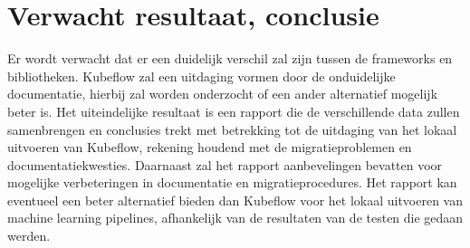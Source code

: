 




\section{Verwacht resultaat, conclusie}%
\label{sec:verwachte_resultaten}
Er wordt verwacht dat er een duidelijk verschil zal zijn tussen de frameworks en bibliotheken. Kubeflow zal een uitdaging vormen door de onduidelijke documentatie, hierbij zal worden onderzocht of een ander alternatief mogelijk beter is.
Het uiteindelijke resultaat is een rapport die de verschillende data zullen samenbrengen en conclusies trekt met betrekking tot de uitdaging van het lokaal uitvoeren van Kubeflow, rekening houdend met de migratieproblemen en documentatiekwesties. Daarnaast zal het rapport aanbevelingen bevatten voor mogelijke verbeteringen in documentatie en migratieprocedures. Het rapport kan eventueel een beter alternatief bieden dan Kubeflow voor het lokaal uitvoeren van machine learning pipelines, afhankelijk van de resultaten van de testen die gedaan werden.

